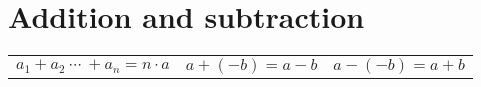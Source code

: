 \section{Addition and subtraction}
\begin{center}
    \begin{longtable}{lcr}
        $a_1 + a_2\ \cdots\ + a_n = n \cdot a$
        &
        $a + (-b) = a - b$
        &
        $a - (-b) = a + b$
    \end{longtable}
\end{center}
